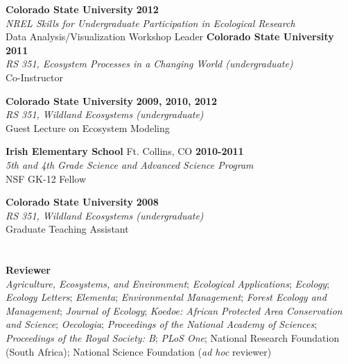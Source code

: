 \documentclass[margin,line]{resume}
\begin{document}
\begin{resume}
    \textbf{Colorado State University} \hfill \textbf{2012}\\ 
               \textsl{NREL Skills for Undergraduate Participation in Ecological Research}\\
               Data Analysis/Visualization Workshop Leader
               		      \newpage{}
    \textbf{Colorado State University} \hfill \textbf{2011}\\ 
               \textsl{RS 351, Ecosystem Processes in a Changing World (undergraduate)}\\
               Co-Instructor 

    \textbf{Colorado State University} \hfill \textbf{2009, 2010, 2012}\\ 
               \textsl{RS 351, Wildland Ecosystems (undergraduate)}\\
               Guest Lecture on Ecosystem Modeling
               
    \textbf{Irish Elementary School} Ft. Collins, CO \hfill \textbf{2010-2011}\\ 
   		\textsl{5th and 4th Grade Science and Advanced Science Program}\\
		NSF GK-12 Fellow
		
     \textbf{Colorado State University} \hfill \textbf{2008}\\ 
               \textsl{RS 351, Wildland Ecosystems (undergraduate)}\\
               Graduate Teaching Assistant 
     \section{\textmd{\textsf{\color{MidnightBlue}{Professional\\Service}}}}
    \textbf{Reviewer}\\
    \textsl{Agriculture, Ecosystems, and Environment};
    \textsl{Ecological Applications};
    \textsl{Ecology};
    \textsl{Ecology Letters};
    \textsl{Elementa};
    \textsl{Environmental Management};
    \textsl{Forest Ecology and Management};
    \textsl{Journal of Ecology};
    \textsl{Koedoe: African Protected Area Conservation and Science};
    \textsl{Oecologia};
    \textsl{Proceedings of the National Academy of Sciences};
    \textsl{Proceedings of the Royal Society: B};
     \textsl{PLoS One};
     National Research Foundation (South Africa);
     National Science Foundation (\emph{ad hoc} reviewer)
	


\end{resume}
\end{document}
